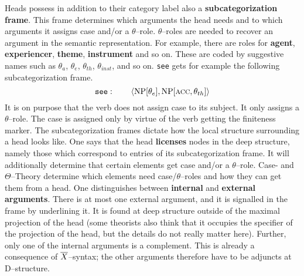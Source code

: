 Heads possess in addition to their category label also a
\textbf{subcategorization frame}. This frame determines which 
arguments the head needs and to which arguments it assigns case 
and/or a $\theta$--role. $\theta$--roles are needed to recover 
an argument in the semantic representation. For example, there 
are roles for \textbf{agent}, \textbf{experiencer}, \textbf{theme}, 
\textbf{instrument} and so on. These are coded by suggestive names 
such as $\theta_a$, $\theta_e$, $\theta_{th}$, $\theta_{inst}$, and so on.  
{\tt see} gets for example the following subcategorization frame.
\begin{equation}
\mbox{\tt see}: \qquad \langle \mbox{\rm NP}[\theta_e], \mbox{\rm
NP}[\mbox{\sc acc}, \theta_{th}]\rangle
\end{equation}
It is on purpose that the verb does not assign case to its subject.
It only assigns a $\theta$--role. The case is assigned only by
virtue of the verb getting the finiteness marker. The subcategorization
frames dictate how the local structure surrounding a head looks
like. One says that the head \textbf{licenses} nodes in the deep
structure, namely those which correspond to entries of its
subcategorization frame. It will additionally determine that
certain elements get case and/or a $\theta$--role. Case- and
$\Theta$--Theory determine which elements need
case/$\theta$--roles and how they can get them from a head.
One distinguishes between \textbf{internal} and \textbf{external
arguments}. There is at most one external argument, and it is
signalled  in the frame by underlining it. It is found at deep
structure outside of the maximal projection of the head (some
theorists also think that it occupies the specifier of the
projection of the head, but the details do not really matter
here). Further, only one of the internal arguments is a
complement. This is already a consequence of $\overline{X}$--syntax;
the other arguments therefore have to be adjuncts at D--structure.

